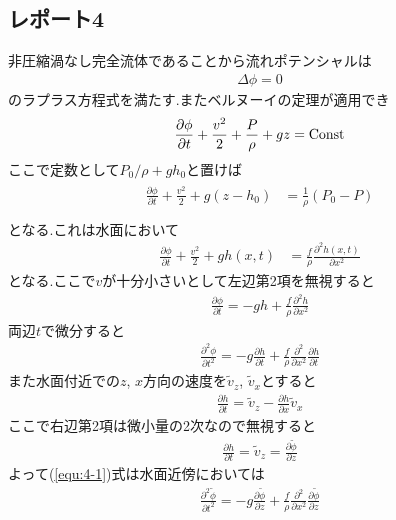 \documentclass[uplatex,a4j,11pt,dvipdfmx]{jsarticle}
\begin{document}
\subsection*{レポート4}
非圧縮渦なし完全流体であることから流れポテンシャルは
\begin{align}
  \Delta \phi=0
\end{align}
のラプラス方程式を満たす.またベルヌーイの定理が適用でき
\begin{align}
  \frac{\partial\phi}{\partial t}+\frac{v^2}{2}+\frac{P}{\rho}+gz={\rm Const}
\end{align}
ここで定数として$P_0/\rho+gh_0$と置けば
\begin{align}
  \begin{split}
    \frac{\partial\phi}{\partial t}+\frac{v^2}{2}+g(z-h_0)&=\frac{1}{\rho}(P_0-P)\\
  \end{split}
\end{align}
となる.これは水面において
\begin{align}
  \frac{\partial\phi}{\partial t}+\frac{v^2}{2}+gh(x,t)&=\frac{f}{\rho}\frac{\partial^2 h(x,t)}{\partial x^2}
\end{align}
となる.ここで$v$が十分小さいとして左辺第2項を無視すると
\begin{align}
  \frac{\partial\phi}{\partial t}=-gh+\frac{f}{\rho}\frac{\partial^2 h}{\partial x^2}
\end{align}
両辺$t$で微分すると
\begin{align}
  \label{equ:4-1}
  \frac{\partial^2\phi}{\partial t^2}=-g\frac{\partial h}{\partial t}+\frac{f}{\rho}\frac{\partial^2}{\partial x^2}\frac{\partial h}{\partial t}
\end{align}
また水面付近での$z$, $x$方向の速度を$\tilde{v}_z$, $\tilde{v}_x$とすると
\begin{align}
  \frac{\partial{h}}{\partial t}=\tilde{v}_z-\frac{\partial{h}}{\partial x}\tilde{v}_x
\end{align}
ここで右辺第2項は微小量の2次なので無視すると
\begin{align}
  \frac{\partial{h}}{\partial t}=\tilde{v}_z=\frac{\partial\tilde{\phi}}{\partial z}
\end{align}
よって(\ref{equ:4-1})式は水面近傍においては
\begin{align}
  \label{equ:4-2}
  \frac{\partial^2\tilde{\phi}}{\partial t^2}=-g\frac{\partial\tilde{\phi}}{\partial z}+\frac{f}{\rho}\frac{\partial^2}{\partial x^2}\frac{\partial\tilde{\phi}}{\partial z}
\end{align}
\end{document}
